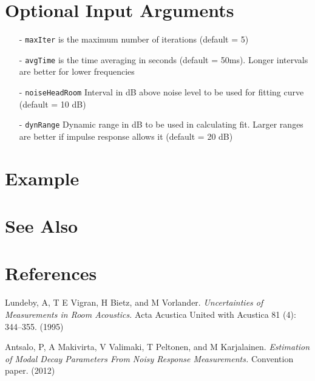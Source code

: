 
\section{Optional Input Arguments} %
\label{sec:rbaLundeby_optional_input_arguments}

\begin{itemize}
	\item[-] \texttt{maxIter} is the maximum number of iterations (default = 5)
	\item[-] \texttt{avgTime} is the time averaging in seconds (default = 50ms). Longer intervals are better for lower frequencies
	\item[-] \texttt{noiseHeadRoom} Interval in dB above noise level to be used for fitting curve (default = 10 dB)
	\item[-] \texttt{dynRange} Dynamic range in dB to be used in calculating fit. Larger ranges are better if impulse response allows it (default = 20 dB)
\end{itemize}



\section{Example} %
\label{sec:rbaLundeby_example}


\section{See Also} %
\label{sec:rbaLundeby_see_also}


\section{References} %
\label{sec:rbaLundeby_references}
Lundeby, A, T E Vigran, H Bietz, and M Vorlander. 
\emph{Uncertainties of Measurements in Room Acoustics.} Acta Acustica United with Acustica 81 (4): 344–355. (1995)

Antsalo, P, A Makivirta, V Valimaki, T Peltonen, and M Karjalainen.
\emph{Estimation of Modal Decay Parameters From Noisy Response Measurements.} Convention paper. (2012)


